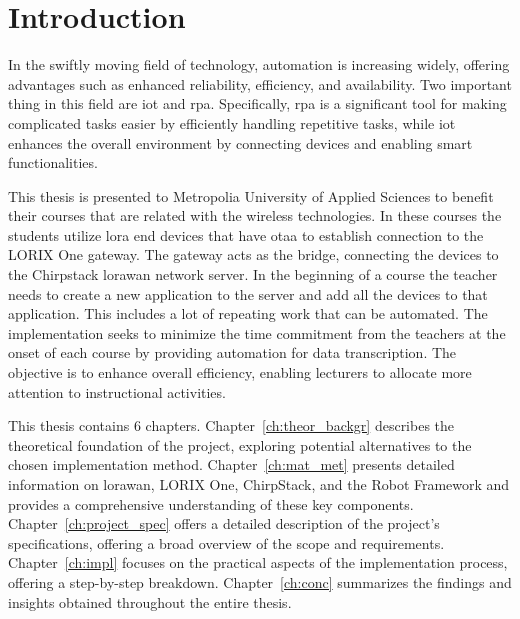 
\chapter{Introduction}

In the swiftly moving field of technology, automation is increasing widely, offering advantages such as enhanced reliability, efficiency, and availability.
Two important thing in this field are  \gls{iot} and \gls{rpa}. Specifically, \gls{rpa} is a significant tool for making complicated tasks easier by efficiently handling repetitive tasks, while \gls{iot} enhances the overall environment by connecting devices and enabling smart functionalities. 

This thesis is presented to Metropolia University of Applied Sciences to benefit their courses that are related with the wireless technologies.
In these courses the students utilize \gls{lora} end devices that have \gls{otaa} to establish connection to the LORIX One gateway.
The gateway acts as the bridge, connecting the devices to the Chirpstack \gls{lorawan} network server.
In the beginning of a course the teacher needs to create a new application to the server and add all the devices to that application.
This includes a lot of repeating work that can be automated.
The implementation seeks to minimize the time commitment from the teachers at the onset of each course by providing automation for data transcription.
The objective is to enhance overall efficiency, enabling lecturers to allocate more attention to instructional activities.

This thesis contains 6 chapters.
Chapter~\ref{ch:theor_backgr} describes the theoretical foundation of the project, exploring potential alternatives to the chosen implementation method.
Chapter~\ref{ch:mat_met} presents detailed information on \gls{lorawan}, LORIX One, ChirpStack, and the Robot Framework and provides a comprehensive understanding of these key components.
Chapter~\ref{ch:project_spec} offers a detailed description of the project's specifications, offering a broad overview of the scope and requirements. 
Chapter~\ref{ch:impl} focuses on the practical aspects of the implementation process, offering a step-by-step breakdown.
Chapter~\ref{ch:conc} summarizes the findings and insights obtained throughout the entire thesis.


\clearpage %
